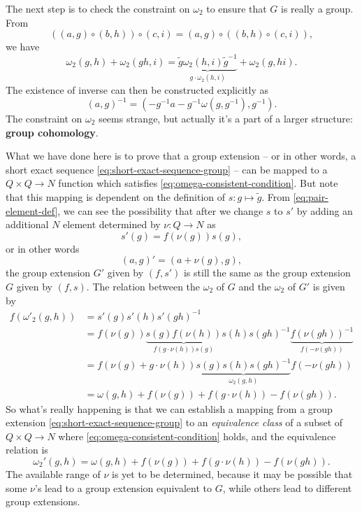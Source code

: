 \documentclass[hyperref, a4paper]{article}
\newcommand*{\concept}[1]{{\textbf{#1}}}
\begin{document}
The next step is to check the constraint on $\omega_2$ to ensure that $G$ is really a group. 
From 
\[
    ((a, g) \circ (b, h)) \circ (c, i) = (a, g) \circ ((b, h) \circ (c, i)),
\]
we have 
\begin{equation}
    \omega_2(g, h) + \omega_2(gh, i) = \underbrace{\tilde{g} \omega_2(h, i) \tilde{g}^{-1}}_{g \cdot \omega_2(h, i)} + \omega_2(g, hi).
    \label{eq:omega-consistent-condition}
\end{equation}
The existence of inverse can then be constructed explicitly as 
\begin{equation}
    (a, g)^{-1} = (-g^{-1} a - g^{-1} \omega(g, g^{-1}), g^{-1}).
\end{equation}
The constraint on $\omega_2$ seems strange, but actually it's a part of a larger structure: \concept{group cohomology}. 

What we have done here is to prove that a group extension -- or in other words, 
a short exact sequence \eqref{eq:short-exact-sequence-group} -- can be mapped to a $Q \times Q \to N$ 
function which satisfies \eqref{eq:omega-consistent-condition}. But note that this mapping is dependent 
on the definition of $s: g \mapsto \tilde{g}$. From \eqref{eq:pair-element-def}, we can see the possibility 
that after we change $s$ to $s'$ by adding an additional $N$ element determined by $\nu: Q \to N$ as 
\[
    s'(g) = f(\nu(g)) s(g),
\]
or in other words 
\[
    (a, g)' = (a + \nu(g), g),
\]
the group extension $G'$ given by $(f, s')$ is still the same as the group extension $G$ given by $(f, s)$.
The relation between the $\omega_2$ of $G$ and the $\omega_2$ of $G'$ is given by
\[
    \begin{aligned}
        f(\omega'_2(g, h)) &= s'(g) s'(h) s'(gh)^{-1} \\
        &= f(\nu(g)) \underbrace{s(g) f(\nu(h))}_{f(g \cdot \nu(h)) s(g)} s(h) s(gh)^{-1} \underbrace{f(\nu(gh))^{-1}}_{f(- \nu(gh))} \\
        &= f(\nu(g) + g \cdot \nu(h)) \underbrace{s(g) s(h) s(gh)^{-1}}_{\omega_2(g, h)} f(- \nu(gh)) \\
        &= \omega(g, h) + f(\nu(g)) + f(g \cdot \nu(h))  - f(\nu(gh)).
    \end{aligned}
\]
So what's really happening is that we can establish a mapping from a group extension 
\eqref{eq:short-exact-sequence-group} to an \emph{equivalence class} of a subset of $Q \times Q \to N$
where \eqref{eq:omega-consistent-condition} holds, and the equivalence relation is  
\begin{equation}
    \omega_2'(g, h) = \omega(g, h) + f(\nu(g)) + f(g \cdot \nu(h))  - f(\nu(gh)).
    \label{eq:omega-2-prime-relation}
\end{equation}
The available range of $\nu$ is yet to be determined, because it may be possible that some $\nu$'s lead to a group 
extension equivalent to $G$, while others lead to different group extensions.
\end{document}
